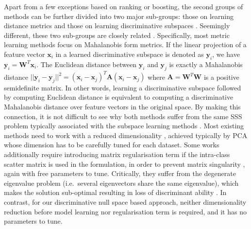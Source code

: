 \documentclass[10pt,twocolumn,letterpaper]{article}
\begin{document}
Apart from a few exceptions \cite{Gray_PedestrianRecognitionEnsembleLocalFeature_08a,Prosser_PerReSVR_10a} based on ranking or boosting, the second groups of methods can be further divided into two major sub-groups: those on learning distance metrics \cite{koestinger2012large,Zheng_RDC_2013a,mignon2012pcca,li2013person} and those on learning discriminative subspaces \cite{pedagadi2013local,lisanti2014matching, xiong2014person,liao2015person}.  Seemingly different, these two sub-groups are closely related \cite{MCML_GlobersonR05}. Specifically, most metric learning methods focus on Mahalanobis form metrics. If the linear projection of a feature vector $\mathbf{x}_i$ in a learned discriminative subspace is denoted as $\mathbf{y}_i$, we have $\mathbf{y}_{i} = \mathbf{W}^{T}\mathbf{x}_{i}$. The Euclidean distance between $\mathbf{y}_{i}$ and $\mathbf{y}_{j}$ is exactly a Mahalanobis distance $||\mathbf{y}_{i}-\mathbf{y}_{j}||^2 =(\mathbf{x}_{i} - \mathbf{x}_{j})^T \mathbf{A} (\mathbf{x}_{i} - \mathbf{x}_{j})$ where $\mathbf{A} = \mathbf{W}^{T}\mathbf{W}$ is a positive semidefinite matrix. In other words, learning a discriminative subspace followed by computing Euclidean distance is equivalent to computing a discriminative Mahalanobis distance over feature vectors in the original space. By making this connection, it is not difficult to see why both methods suffer from the same SSS problem typically associated with the subspace learning methods \cite{ChenLKLY00,ZhengZZ05,guo2006null}. Most existing methods need to work with a reduced dimensionality \cite{pedagadi2013local}, achieved typically by PCA whose dimension has to be carefully tuned for each dataset. Some works additionally require introducing matrix regularisation term if the intra-class scatter matrix is used in the formulation, in order to prevent matrix singularity \cite{pedagadi2013local,lisanti2014matching, xiong2014person,liao2015person}, again with free parameters to tune. Critically, they suffer from  the degenerate eigenvalue problem (i.e.~several eigenvectors share the same eigenvalue), which makes the solution sub-optimal resulting in  loss of discriminant ability \cite{ZhengZZ05}. In contrast, for our discriminative  null space based approach, neither dimensionality reduction before model learning nor regularisation term is required,   and it has no parameters to tune. %



\end{document}
